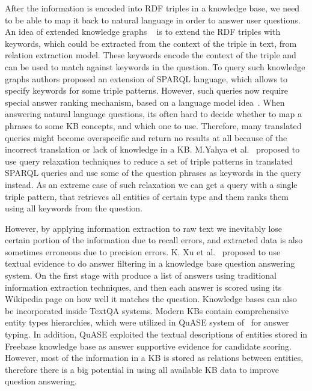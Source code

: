 After the information is encoded into RDF triples in a knowledge base, we need to be able to map it back to natural language in order to answer user questions.
An idea of extended knowledge graphs ~\cite{elbassuoni2009language,yahya2013robust} is to extend the RDF triples with keywords, which could be extracted from the context of the triple in text, \eg from relation extraction model.
These keywords encode the context of the triple and can be used to match against keywords in the question.
To query such knowledge graphs authors proposed an extension of SPARQL language, which allows to specify keywords for some triple patterns.
However, such queries now require special answer ranking mechanism, \eg based on a language model idea~\cite{elbassuoni2009language}.
When answering natural language questions, its often hard to decide whether to map a phrases to some KB concepts, and which one to use.
Therefore, many translated queries might become overspecific and return no results at all because of the incorrect translation or lack of knowledge in a KB.
M.Yahya et al.~\cite{yahya2013robust,yahya2016relationship} proposed to use query relaxation techniques to reduce a set of triple patterns in translated SPARQL queries and use some of the question phrases as keywords in the query instead.
As an extreme case of such relaxation we can get a query with a single triple pattern, that retrieves all entities of certain type and them ranks them using all keywords from the question.

However, by applying information extraction to raw text we inevitably lose certain portion of the information due to recall errors, and extracted data is also sometimes erroneous due to precision errors.
K. Xu et al.~\cite{xu2016enhancing} proposed to use textual evidence to do answer filtering in a knowledge base question answering system.
On the first stage with produce a list of answers using traditional information extraction techniques, and then each answer is scored using its Wikipedia page on how well it matches the question. 
Knowledge bases can also be incorporated inside TextQA systems.
Modern KBs contain comprehensive entity types hierarchies, which were utilized in QuASE system of~\cite{Sun:2015:ODQ:2736277.2741651} for answer typing.
In addition, QuASE exploited the textual descriptions of entities stored in Freebase knowledge base as answer supportive evidence for candidate scoring.
However, most of the information in a KB is stored as relations between entities, therefore there is a big potential in using all available KB data to improve question answering.

